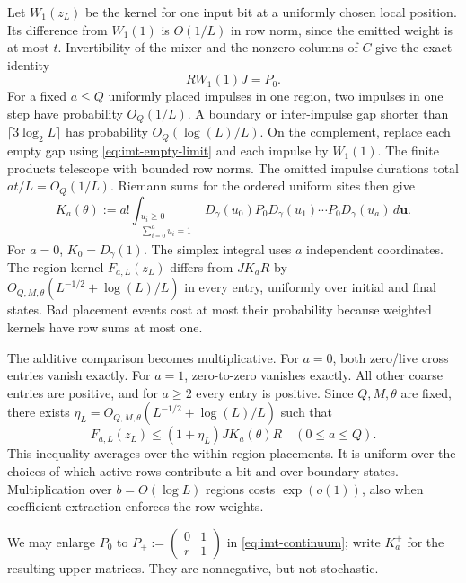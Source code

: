 Let $W_1(z_L)$ be the kernel for one input bit at a uniformly chosen local
position. Its difference from $W_1(1)$ is $O(1/L)$ in row norm, since the
emitted weight is at most $t$. Invertibility of the mixer and the nonzero
columns of $C$ give the exact identity
\[
 RW_1(1)J=P_0.
\]
For a fixed $a\le Q$ uniformly placed impulses in one region, two impulses in
one step have probability $O_Q(1/L)$. A boundary or inter-impulse gap shorter
than $\lceil3\log_2L\rceil$ has probability $O_Q(\log(L)/L)$.
On the complement, replace each empty gap using
\eqref{eq:imt-empty-limit} and each impulse by $W_1(1)$. The finite products
telescope with bounded row norms. The omitted impulse durations total
$at/L=O_Q(1/L)$. Riemann sums for the ordered uniform sites then give
\begin{equation}
 K_a(\theta):=a!\int_{\substack{u_i\ge0\\\sum_{i=0}^a u_i=1}}
 D_\gamma(u_0)P_0D_\gamma(u_1)\cdots P_0D_\gamma(u_a)\,d\boldsymbol u.
 \label{eq:imt-continuum}
\end{equation}
For $a=0$, $K_0=D_\gamma(1)$. The simplex integral uses $a$ independent
coordinates. The region kernel $F_{a,L}(z_L)$ differs from $JK_aR$
by $O_{Q,M,\theta}(L^{-1/2}+\log(L)/L)$ in every entry, uniformly over
initial and final states. Bad placement events cost at most their probability
because weighted kernels have row sums at most one.

The additive comparison becomes multiplicative. For $a=0$, both zero/live
cross entries vanish exactly. For $a=1$, zero-to-zero vanishes exactly.
All other coarse entries are positive, and for $a\ge2$ every entry is
positive. Since $Q,M,\theta$ are fixed, there exists
$\eta_L=O_{Q,M,\theta}(L^{-1/2}+\log(L)/L)$ such that
\begin{equation}
 F_{a,L}(z_L)\le(1+\eta_L)JK_a(\theta)R\quad(0\le a\le Q).
 \label{eq:imt-componentwise-limit}
\end{equation}
This inequality averages over the within-region placements. It is uniform
over the choices of which active rows contribute a bit and over boundary
states. Multiplication over $b=O(\log L)$ regions costs $\exp(o(1))$,
also when coefficient extraction enforces the row weights.

We may enlarge $P_0$ to
$P_+:=\left(\begin{smallmatrix}0&1\\r&1\end{smallmatrix}\right)$
in \eqref{eq:imt-continuum}; write $K_a^+$ for the resulting upper matrices.
They are nonnegative, but not stochastic.

